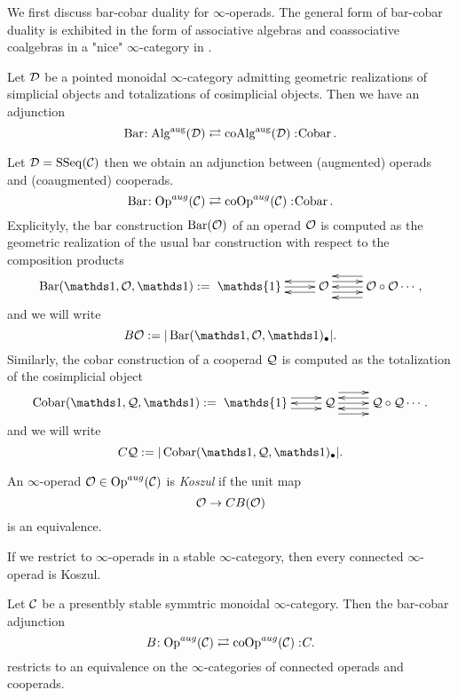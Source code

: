 We first discuss bar-cobar duality for $\infty$-operads. The general form of bar-cobar duality is exhibited in the form of associative algebras and coassociative coalgebras in a "nice" $\infty$-category in \cite{HA}.
\begin{proposition}[\cite{HA}[Remark 5.2.2.19.] 
Let ${\mathcal{D}}$ be a pointed monoidal $\infty$-category admitting geometric realizations of simplicial objects and totalizations of cosimplicial objects. Then we have an adjunction
\[
\operatorname{Bar}\negmedspace: \operatorname{Alg}^{\operatorname{aug}} ({\mathcal{D}})\rightleftarrows \operatorname{coAlg}^{\operatorname{aug}}({\mathcal{D}}):\negmedspace \operatorname{Cobar}.
\]
\end{proposition}
Let ${\mathcal{D}}= \operatorname{SSeq}({\mathcal{C}})$ then we obtain an adjunction between (augmented) operads and (coaugmented) cooperads.
	$$
	\operatorname{Bar}\negmedspace: \operatorname{Op}^{aug}({\mathcal{C}})\rightleftarrows \operatorname{coOp}^{aug}({\mathcal{C}}):\negmedspace \operatorname{Cobar}.
	$$
Explicityly, the bar construction $\operatorname{Bar}({\mathcal{O}})$ of an operad ${\mathcal{O}}$ is computed as the geometric realization of the usual bar construction with respect to the composition products \cite[Section 4.4.2]{HA}
	\[
		\Barconstruction(\triv, \CO, \triv):=\xymatrix{ \mathds{1}\ar@<0ex>[r]  &  
		\CO \ar@<1ex>[r] \ar@<-1ex>[r] \ar@<1ex>[l] \ar@<-1ex>[l]  &  \CO\circ \CO \ar@<2ex>[l] \ar@<0ex>[l] \ar@<-2ex>[l] \cdots},
\]
and we will write 
$$
B\CO := |\Barconstruction(\triv, \CO, \triv)_{\bullet}|.
$$
	Similarly, the cobar construction of a cooperad ${\mathcal{Q}}$ is computed as the totalization of the cosimplicial object
	\[
		\Cobar(\triv, \CQ, \triv):=\xymatrix{ \mathds{1} \ar@<1ex>[r] \ar@<-1ex>[r] &  
		\CQ \ar@<0ex>[l] \ar@<2ex>[r] \ar@<0ex>[r] \ar@<-2ex>[r] & \CQ\circ \CQ \ar@<1ex>[l] \ar@<-1ex>[l] \cdots}.
\]
and we will write 
$$
C\CQ := |\Cobar(\triv, \CQ, \triv)_{\bullet}|.
$$



\begin{definition}
	An $\infty$-operad ${\mathcal{O}}\in \operatorname{Op}^{aug}({\mathcal{C}})$ is \emph{Koszul} if the unit map
	$$
	{\mathcal{O}}\rightarrow CB({\mathcal{O}})
	$$
	is an equivalence.
\end{definition}

If we restrict to $\infty$-operads in a stable $\infty$-category, then every connected $\infty$-operad is Koszul.

\begin{proposition}
\cite[Proposition 3.4]{Heuts_Koszul}
\label{Connected operads are Koszul}
Let ${\mathcal{C}}$ be a presentbly stable symmtric monoidal $\infty$-category. Then the bar-cobar adjunction
	$$
	B\negmedspace: \operatorname{Op}^{aug}({\mathcal{C}})\rightleftarrows \operatorname{coOp}^{aug}({\mathcal{C}}):\negmedspace C.
	$$
	restricts to an equivalence on the  $\infty$-categories of connected operads and cooperads.
\end{proposition}


